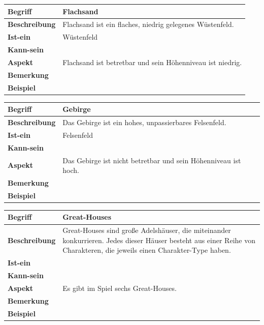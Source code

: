 \documentclass{uulm-assignment}
\begin{document}
\begin{tabularx}{16cm}{|l|X|}
\hline
\textbf{Begriff} & \textbf{Flachsand} \\
\hline
\textbf{Beschreibung} & Flachsand ist ein flaches, niedrig gelegenes Wüstenfeld. \\
\hline
\textbf{Ist-ein} & Wüstenfeld\\
\hline
\textbf{Kann-sein} & \\
\hline
\textbf{Aspekt} & Flachsand ist betretbar und sein Höhenniveau ist niedrig.\\
\hline
\textbf{Bemerkung} &  \\
\hline
\textbf{Beispiel} &  \\
\hline
\end{tabularx}

\begin{tabularx}{16cm}{|l|X|}
\hline
\textbf{Begriff} & \textbf{Gebirge} \\
\hline
\textbf{Beschreibung} & Das Gebirge ist ein hohes, unpassierbares Felsenfeld. \\
\hline
\textbf{Ist-ein} & Felsenfeld\\
\hline
\textbf{Kann-sein} & \\
\hline
\textbf{Aspekt} & Das Gebirge ist nicht betretbar und sein Höhenniveau ist hoch. \\
\hline
\textbf{Bemerkung} &  \\
\hline
\textbf{Beispiel} &  \\
\hline
\end{tabularx}

\begin{tabularx}{16cm}{|l|X|}
\hline
\textbf{Begriff} & \textbf{Great-Houses} \\
\hline
\textbf{Beschreibung} & Great-Houses sind große Adelshäuser, die miteinander konkurrieren. Jedes dieser Häuser besteht aus einer Reihe von Charakteren, die jeweils einen Charakter-Type haben. \\
\hline
\textbf{Ist-ein} & \\
\hline
\textbf{Kann-sein} & \\
\hline
\textbf{Aspekt} & Es gibt im Spiel sechs Great-Houses.\\
\hline
\textbf{Bemerkung} &  \\
\hline
\textbf{Beispiel} &  \\
\hline
\end{tabularx}
\end{document}
